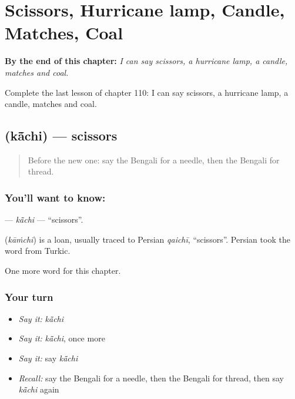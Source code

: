 
\chapter{Scissors, Hurricane lamp, Candle, Matches, Coal}
\label{ch:bn-scissors-hurricane-lamp-candle-matches-coal}

\begin{chapteropening}
\textbf{By the end of this chapter:} \emph{I can say scissors, a hurricane lamp, a candle, matches and coal.}

Complete the last lesson of chapter 110: I can say scissors, a hurricane lamp, a candle, matches and coal.
\end{chapteropening}

\section[\texorpdfstring{\bn{কাঁচি} (kā̃chi)}{কাঁচি (kā̃chi)}]{ (kā̃chi) — scissors}

\label{lesson:BN-C110-kachi}



\begin{quote}
Before the new one: say the Bengali for a needle, then the Bengali for thread.
\end{quote}

\subsection*{You'll want to know: }
\textbf{} — \emph{kā̃chi} — \textquotedblleft{}scissors\textquotedblright{}.

\begin{cousinweb}
\textbf{} (\emph{kāṁchi}) is a loan, usually traced to Persian \emph{qaichī}, \textquotedblleft{}scissors\textquotedblright{}. Persian took the word from Turkic.
\end{cousinweb}

\begin{grammarlens}[title={What you've built}]
One more word for this chapter.
\end{grammarlens}

\subsection*{Your turn}
\begin{itemize}
\raggedright
  \item \emph{Say it:} \emph{kā̃chi}
  \item \emph{Say it:} \emph{kā̃chi}, once more
  \item \emph{Say it:} say \emph{kā̃chi}
  \item \emph{Recall:} say the Bengali for a needle, then the Bengali for thread, then say \emph{kā̃chi} again
\end{itemize}

